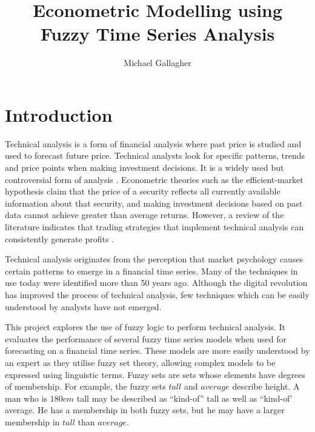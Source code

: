 \documentclass[12pt, oneside, a4paper]{article}
\title{Econometric Modelling using \\Fuzzy Time Series Analysis}
\author{Michael Gallagher}
\theoremstyle{definition}
\begin{document}
\maketitle
\tableofcontents

\listoffigures

\listoftables

\newpage

\section{Introduction}

Technical analysis is a form of financial analysis where past price is studied and used to forecast future price. Technical analysts look for specific patterns, trends and price points when making investment decisions. It is a widely used but controversial form of analysis \citep{foundations}. Econometric theories such as the efficient-market hypothesis claim that the price of a security reflects all currently available information about that security, and making investment decisions based on past data cannot achieve greater than average returns. However, a review of the literature indicates that trading strategies that implement technical analysis can consistently generate profits \citep{taprofitability}.

Technical analysis originates from the perception that market psychology causes certain patterns to emerge in a financial time series. Many of the techniques in use today were identified more than 50 years ago. Although the digital revolution has improved the process of technical analysis, few techniques which can be easily understood by analysts have not emerged.

This project explores the use of fuzzy logic to perform technical analysis. It evaluates the performance of several fuzzy time series models when used for forecasting on a financial time series. These models are more easily understood by an expert as they utilise fuzzy set theory, allowing complex models to be expressed using linguistic terms. Fuzzy sets are sets whose elements have degrees of membership. For example, the fuzzy sets $tall$ and $average$ describe height. A man who is $180cm$ tall may be described as ``kind-of'' tall as well as ``kind-of' average. He has a membership in both fuzzy sets, but he may have a larger membership in $tall$ than $average$.
\end{document}
